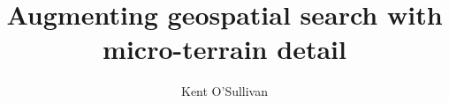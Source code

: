 \documentclass[sigconf]{acmart}
\begin{document}

\renewcommand{\shortauthors}{O'Sullivan}

\graphicspath{ {figures/}{auto_commit_fig/}{auto_fig/} }

\newcommand{\latexfile}[1]{}





\title{Augmenting geospatial search with micro-terrain detail\\}

\author{Kent O'Sullivan}

\begin{abstract}
\latexfile{00_Abstract.tex}
\end{abstract}

\maketitle


\latexfile{10_Introduction.tex}
\latexfile{20_Problem.tex}
\latexfile{30_Architecture.tex}
\latexfile{40_Implementation.tex}
\latexfile{50_Results.tex}
\latexfile{60_Related.tex}
\latexfile{80_Conclusion.tex}


 \label{bibliography}
\end{document}
